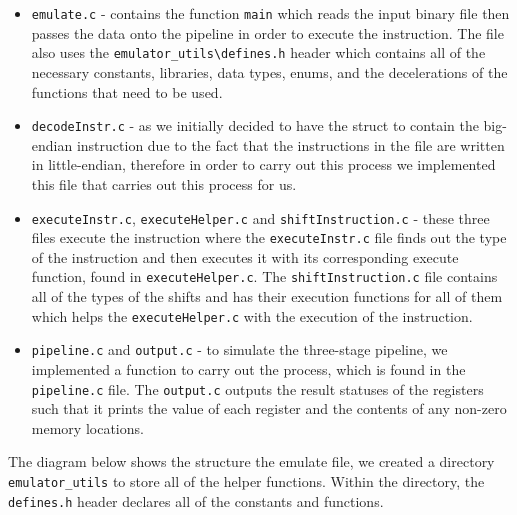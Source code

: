 \documentclass[10pt]{article}
\begin{document}
\begin{itemize}
	\item {\tt{emulate.c}} - contains the function {\tt{main}} which reads the input binary file then passes the data onto the pipeline in order to execute the instruction. The file also uses the {\tt{emulator\_utils\textbackslash defines.h}} header which contains all of the necessary constants, libraries, data types, enums, and the decelerations of the functions that need to be used.
	\item {\tt{decodeInstr.c}} - as we initially decided to have the struct to contain the big-endian instruction due to the fact that the instructions in the file are written in little-endian, therefore in order to carry out this process we implemented this file that carries out this process for us.
	\item {\tt{executeInstr.c}}, {\tt{executeHelper.c}} and {\tt{shiftInstruction.c}} - these three files execute the instruction where the {\tt{executeInstr.c}} file finds out the type of the instruction and then executes it with its corresponding execute function, found in {\tt{executeHelper.c}}. The {\tt{shiftInstruction.c}} file contains all of the types of the shifts and has their execution functions for all of them which helps the {\tt{executeHelper.c}} with the execution of the instruction.
	\item {\tt{pipeline.c}} and {\tt{output.c}} - to simulate the three-stage pipeline, we implemented a function to carry out the process, which is found in the {\tt{pipeline.c}} file. The {\tt{output.c}} outputs the result statuses of the registers such that it prints the value of each register and the contents of any non-zero memory locations.
	
\end{itemize}


The diagram below shows the structure the emulate file, we created a directory {\tt{emulator\_utils}} to store all of the helper functions. Within the directory, the {\tt{defines.h}} header declares all of the constants and functions.
\begin{center}

\end{center}
\end{document}
